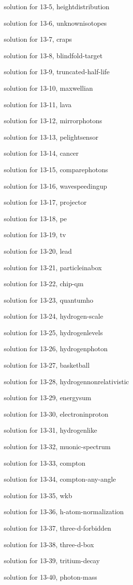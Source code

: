 \documentclass{problems}
\begin{document}
solution for 13-5, heightdistribution

solution for 13-6, unknownisotopes

solution for 13-7, craps

solution for 13-8, blindfold-target

solution for 13-9, truncated-half-life

solution for 13-10, maxwellian

solution for 13-11, lava

solution for 13-12, mirrorphotons

solution for 13-13, pelightsensor

solution for 13-14, cancer

solution for 13-15, comparephotons

solution for 13-16, wavespeedingup

solution for 13-17, projector

solution for 13-18, pe

solution for 13-19, tv

solution for 13-20, lead

solution for 13-21, particleinabox

solution for 13-22, chip-qm

solution for 13-23, quantumho

solution for 13-24, hydrogen-scale

solution for 13-25, hydrogenlevels

solution for 13-26, hydrogenphoton

solution for 13-27, basketball

solution for 13-28, hydrogennonrelativistic

solution for 13-29, energysum

solution for 13-30, electroninproton

solution for 13-31, hydrogenlike

solution for 13-32, muonic-spectrum

solution for 13-33, compton

solution for 13-34, compton-any-angle

solution for 13-35, wkb

solution for 13-36, h-atom-normalization

solution for 13-37, three-d-forbidden

solution for 13-38, three-d-box

solution for 13-39, tritium-decay

solution for 13-40, photon-mass
\end{document}
